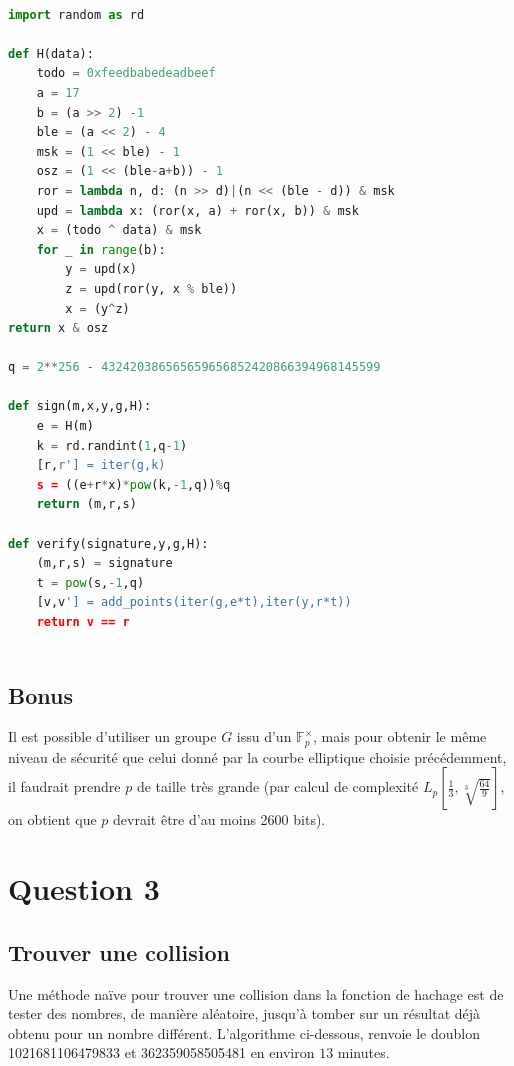 \documentclass{article}
\newcommand{\bF}{\mathbb{F}}
\begin{document}
\begin{lstlisting}[language = Python]

import random as rd

def H(data):
    todo = 0xfeedbabedeadbeef
    a = 17
    b = (a >> 2) -1
    ble = (a << 2) - 4
    msk = (1 << ble) - 1
    osz = (1 << (ble-a+b)) - 1
    ror = lambda n, d: (n >> d)|(n << (ble - d)) & msk
    upd = lambda x: (ror(x, a) + ror(x, b)) & msk
    x = (todo ^ data) & msk
    for _ in range(b):
        y = upd(x)
        z = upd(ror(y, x % ble))
        x = (y^z)
return x & osz

q = 2**256 - 432420386565659656852420866394968145599

def sign(m,x,y,g,H):
    e = H(m)
    k = rd.randint(1,q-1)
    [r,r'] = iter(g,k)
    s = ((e+r*x)*pow(k,-1,q))%q
    return (m,r,s)

def verify(signature,y,g,H):
    (m,r,s) = signature
    t = pow(s,-1,q)
    [v,v'] = add_points(iter(g,e*t),iter(y,r*t))
    return v == r
    
\end{lstlisting}

\subsection{Bonus}

Il est possible d'utiliser un groupe $G$ issu d'un $\bF_p^\times$, mais pour obtenir le même niveau de sécurité que celui donné par la courbe elliptique choisie précédemment, il faudrait prendre $p$ de taille très grande (par calcul de complexité $\displaystyle L_p\left[\frac{1}{3}, \sqrt[3]{\frac{64}{9}}\right]$, on obtient que $p$ devrait être d'au moins 2600 bits).

\newpage
\section{Question 3}

\subsection{Trouver une collision}

Une méthode naïve pour trouver une collision dans la fonction de hachage est de tester des nombres, de manière aléatoire, jusqu'à tomber sur un résultat déjà obtenu pour un nombre différent. L'algorithme ci-dessous, renvoie le doublon 1021681106479833 et 362359058505481 en environ $13$ minutes.
\end{document}
